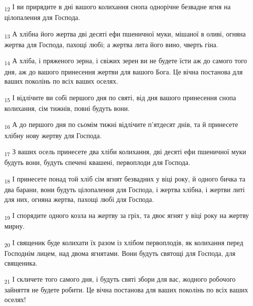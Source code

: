 \begin{tcolorbox}
\textsubscript{12} І ви прирядите в дні вашого колихання снопа однорічне безвадне ягня на цілопалення для Господа.
\end{tcolorbox}
\begin{tcolorbox}
\textsubscript{13} А хлібна його жертва дві десяті ефи пшеничної муки, мішаної в оливі, огняна жертва для Господа, пахощі любі; а жертва лита його вино, чверть гіна.
\end{tcolorbox}
\begin{tcolorbox}
\textsubscript{14} А хліба, і пряженого зерна, і свіжих зерен ви не будете їсти аж до самого того дня, аж до вашого принесення жертви для вашого Бога. Це вічна постанова для ваших поколінь по всіх ваших оселях.
\end{tcolorbox}
\begin{tcolorbox}
\textsubscript{15} І відлічите ви собі першого дня по святі, від дня вашого принесення снопа колихання, сім тижнів, повні будуть вони.
\end{tcolorbox}
\begin{tcolorbox}
\textsubscript{16} А до першого дня по сьомім тижні відлічите п'ятдесят днів, та й принесете хлібну нову жертву для Господа.
\end{tcolorbox}
\begin{tcolorbox}
\textsubscript{17} З ваших осель принесете два хліби колихання, дві десяті ефи пшеничної муки будуть вони, будуть спечені квашені, первоплоди для Господа.
\end{tcolorbox}
\begin{tcolorbox}
\textsubscript{18} І принесете понад той хліб сім ягнят безвадних у віці року, й одного бичка та два барани, вони будуть цілопалення для Господа, і жертва хлібна, і жертви литі для них, огняна жертва, пахощі любі для Господа.
\end{tcolorbox}
\begin{tcolorbox}
\textsubscript{19} І спорядите одного козла на жертву за гріх, та двоє ягнят у віці року на жертву мирну.
\end{tcolorbox}
\begin{tcolorbox}
\textsubscript{20} І священик буде колихати їх разом із хлібом первоплодів, як колихання перед Господнім лицем, над двома ягнятами. Вони будуть святощі для Господа, для священика.
\end{tcolorbox}
\begin{tcolorbox}
\textsubscript{21} І скличете того самого дня, і будуть святі збори для вас, жодного робочого зайняття не будете робити. Це вічна постанова для ваших поколінь по всіх ваших оселях!
\end{tcolorbox}
